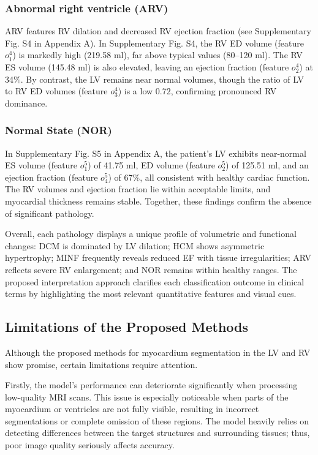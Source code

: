 \documentclass[fleqn,10pt]{wlscirep}
\begin{document}
\subsubsection*{Abnormal right ventricle (ARV)}

ARV features RV dilation and decreased RV ejection fraction (see Supplementary Fig. S4 in Appendix A). In Supplementary Fig. S4, the RV ED volume (feature \(o_1^4\)) is markedly high (219.58 ml), far above typical values (80–120 ml). The RV ES volume (145.48 ml) is also elevated, leaving an ejection fraction (feature \(o_2^4\)) at 34\%. By contrast, the LV remains near normal volumes, though the ratio of LV to RV ED volumes (feature \(o_3^4\)) is a low 0.72, confirming pronounced RV dominance.

\subsubsection*{Normal State (NOR)}

In Supplementary Fig. S5 in Appendix A, the patient’s LV exhibits near-normal ES volume (feature \(o_1^5\)) of 41.75 ml, ED volume (feature \(o_2^5\)) of 125.51 ml, and an ejection fraction (feature \(o_4^5\)) of 67\%, all consistent with healthy cardiac function. The RV volumes and ejection fraction lie within acceptable limits, and myocardial thickness remains stable. Together, these findings confirm the absence of significant pathology.

Overall, each pathology displays a unique profile of volumetric and functional changes: DCM is dominated by LV dilation; HCM shows asymmetric hypertrophy; MINF frequently reveals reduced EF with tissue irregularities; ARV reflects severe RV enlargement; and NOR remains within healthy ranges. The proposed interpretation approach clarifies each classification outcome in clinical terms by highlighting the most relevant quantitative features and visual cues.

\subsection*{Limitations of the Proposed Methods}

Although the proposed methods for myocardium segmentation in the LV and RV show promise, certain limitations require attention.

Firstly, the model’s performance can deteriorate significantly when processing low-quality MRI scans. This issue is especially noticeable when parts of the myocardium or ventricles are not fully visible, resulting in incorrect segmentations or complete omission of these regions. The model heavily relies on detecting differences between the target structures and surrounding tissues; thus, poor image quality seriously affects accuracy.
\end{document}
